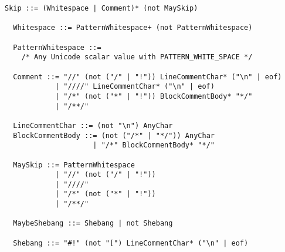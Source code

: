 \documentclass[dvipdfmx,uplatex,papersize,a4paper,10pt]{jsbook}
\theoremstyle{definition}
\begin{document}
\begin{lstlisting}[language=BNFLike, gobble=2]
  Skip ::= (Whitespace | Comment)* (not MaySkip)

  Whitespace ::= PatternWhitespace+ (not PatternWhitespace)

  PatternWhitespace ::=
    /* Any Unicode scalar value with PATTERN_WHITE_SPACE */

  Comment ::= "//" (not ("/" | "!")) LineCommentChar* ("\n" | eof)
            | "////" LineCommentChar* ("\n" | eof)
            | "/*" (not ("*" | "!")) BlockCommentBody* "*/"
            | "/**/"

  LineCommentChar ::= (not "\n") AnyChar
  BlockCommentBody ::= (not ("/*" | "*/")) AnyChar
                     | "/*" BlockCommentBody* "*/"

  MaySkip ::= PatternWhitespace
            | "//" (not ("/" | "!"))
            | "////"
            | "/*" (not ("*" | "!"))
            | "/**/"

  MaybeShebang ::= Shebang | not Shebang

  Shebang ::= "#!" (not "[") LineCommentChar* ("\n" | eof)
\end{lstlisting}
\end{document}
